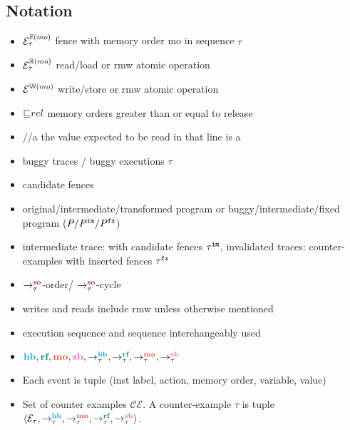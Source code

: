 \subsection{Notation}
\begin{itemize}
	\item $\ordfences{mo}_\tau$ \quad fence with memory order mo in sequence $\tau$
	\item $\ordreads{mo}_\tau$ \quad read/load or rmw atomic operation
	\item $\ordwrites{mo}$ \qquad write/store or rmw atomic operation
	\item $\mole rel$ \qquad memory orders greater than or equal to release
	\item \color{olive}//a \color{black} \qquad the value expected to be read in that line is a
	\item buggy traces / buggy executions  $\tau$
	\item candidate fences
	\item original/intermediate/transformed program or buggy/intermediate/fixed program ($ P/ \im{P}/ \fx{P} $)
	\item intermediate trace: with candidate fences $ \im{\tau} $, invalidated traces: counter-examples with inserted fences $\fx{\tau}$
	\item $\setSO$-order/ $\setSO$-cycle
	\item writes and reads include rmw unless otherwise mentioned
	\item execution sequence and sequence interchangeably used
	\item $ \lhb, \lrf, \lmo, \lsb, \setHB, \setRF, \setMO, \setSB $
	\item Each event is tuple (inst label, action, memory order, variable, value) 
	\item Set of counter examples $ \mathcal{CE} $. A counter-example $ \tau $ is tuple $ \langle \events_\tau, \setHB, \setMO, \setRF, \setSB  \rangle $. 
\end{itemize}